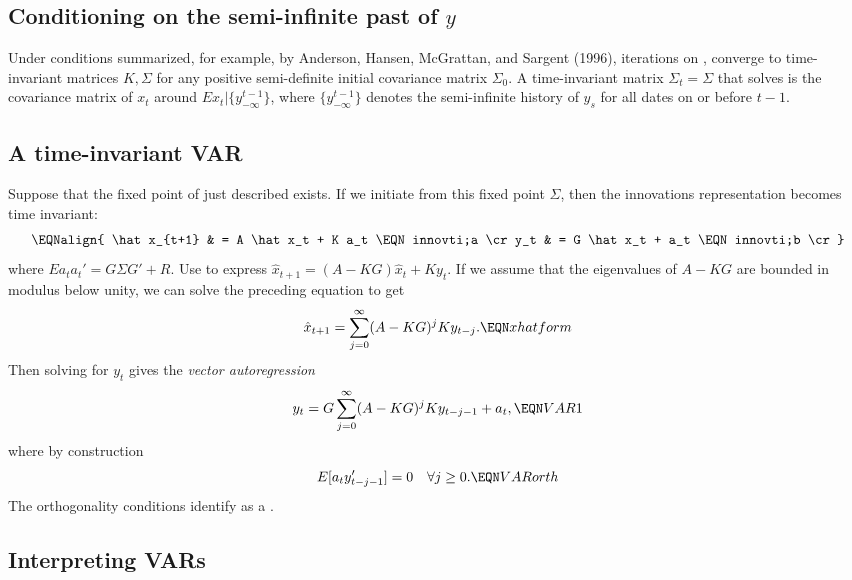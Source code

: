 \subsection{Conditioning on the semi-infinite past of $y$}
Under  conditions summarized, for example, by
Anderson, Hansen, McGrattan, and Sargent (1996), iterations on ,  converge to time-invariant matrices
$K, \Sigma$ for any positive semi-definite initial covariance matrix $\Sigma_0$.
A time-invariant matrix $\Sigma_t=\Sigma$ that solves  is the covariance matrix
of $x_t$ around $E x_t | \{y^{t-1}_{-\infty}\} $, where $\{y^{t-1}_{-\infty}\}$ denotes the semi-infinite
history of $y_s$ for all dates on or before $t-1$.
%

\subsection{A time-invariant VAR}
Suppose that  the fixed point of  just  described exists. If we initiate  from this fixed point $\Sigma$, then the  innovations representation
becomes time invariant:
$$\EQNalign{ \hat x_{t+1} & = A \hat x_t + K a_t \EQN innovti;a \cr
             y_t & = G \hat x_t + a_t \EQN innovti;b \cr} $$
where $E a_t a_t' = G \Sigma G' + R$.  Use  to express
$ \hat x_{t+1} = (A -KG) \hat x_t + K y_t$.  If we assume that
the eigenvalues of $A-KG$ are bounded in modulus below unity, we can
solve the preceding equation to get
$$\hat x_{t+1} = \sum_{j=0}^\infty  (A-KG)^j K y_{t-j}. \EQN xhatform $$
Then solving  for $y_t$ gives
the {\it vector autoregression\/}
$$ y_t = G \sum_{j=0}^\infty (A-KG)^j K y_{t-j-1} + a_t ,\EQN VAR1 $$
where by construction
$$ E[a_t y_{t-j-1}' ]= 0 \quad \forall j \geq 0 .\EQN VARorth $$
The orthogonality conditions  identify  as a .

\subsection{Interpreting VARs}

